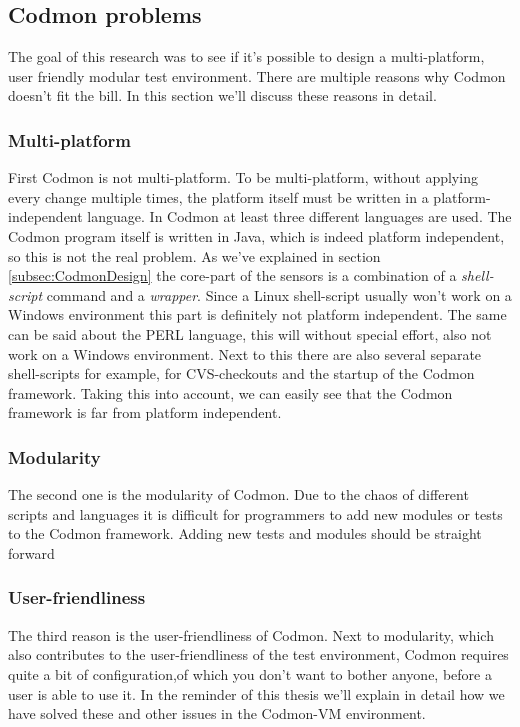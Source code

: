 \documentclass{article}
\newcommand{\project}{Codmon-VM}
\begin{document}
\subsection{Codmon problems}
\label{subsec:CodmonProblems}
The goal of this research was to see if it's possible to design a multi-platform, user friendly modular test environment. There are multiple reasons why Codmon doesn't fit the bill. In this section
we'll discuss these reasons in detail.
 
\subsubsection{Multi-platform}
\label{prob:multi}
First Codmon is not multi-platform. To be multi-platform, without applying every change multiple times, the platform itself must be written in a platform-independent language. 
In Codmon at least three different languages are used. The Codmon program itself is written in Java, which is indeed platform independent\cite{Java}, so this is not the real problem. As we've explained in 
section \ref{subsec:CodmonDesign} the core-part of the sensors is a combination of a \emph{shell-script} command and a \emph{wrapper}. Since a Linux shell-script usually won't work on a Windows environment 
this part is definitely not platform independent. The same can be said about the PERL language, this will without special effort, also not work on a Windows environment. Next to this there are also several 
separate shell-scripts for example, for  CVS-checkouts and the startup of the Codmon framework. Taking this into account, we can easily see that the Codmon framework is far from platform independent.

\subsubsection{Modularity}
\label{prob:modular} 
The second one is the modularity of Codmon. Due to the chaos of different scripts and languages it is difficult for programmers to add new modules or tests to the Codmon framework. Adding new tests and modules 
should be straight forward 

\subsubsection{User-friendliness}
\label{prob:user}
The third reason is the user-friendliness of Codmon. Next to modularity, which also contributes to the user-friendliness of the test environment, Codmon requires quite a bit of configuration,of 
which you don't want to bother anyone, before a user is able to use it. In the reminder of this thesis we'll explain in detail how we have solved these and other issues in the \project{} environment.\\
 
\end{document}
